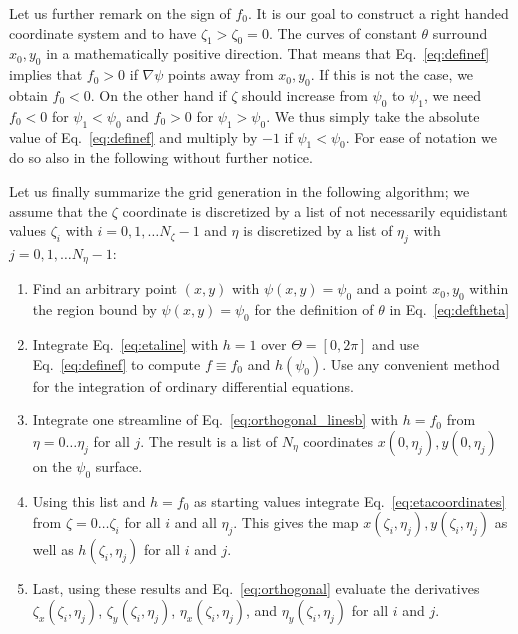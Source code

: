 Let us further remark on the sign of $f_0$. It is our goal to construct a right handed
coordinate system and to have $\zeta_1>\zeta_0=0$.
The curves of constant $\theta$ surround $x_0, y_0$ in a mathematically positive direction. 
That means that Eq.~\eqref{eq:definef} implies that $f_0>0$ if $\nabla \psi$ points away from $x_0, y_0$. If this is not the case, we obtain $f_0 < 0$. 
On the other hand if $\zeta$ should increase from $\psi_0$ to $\psi_1$, we
need $f_0 <0$ for $\psi_1<\psi_0$ and $f_0>0$ for $\psi_1>\psi_0$. 
We thus simply take the absolute value of Eq.~\eqref{eq:definef} and multiply 
by $-1$ if $\psi_1<\psi_0$. 
For ease of notation we do so also in the following without further notice.

Let us finally summarize the grid generation in the following algorithm; we 
assume that the $\zeta$ coordinate is discretized by a list of 
not necessarily equidistant values $\zeta_i$ with $i = 0,1,\dots N_\zeta-1$ 
and $\eta$ is discretized by a list of $\eta_j$ with $j = 0,1,\dots N_\eta-1$:
\begin{enumerate}
  \item Find an arbitrary point $(x,y)$ with $\psi(x,y) = \psi_0$
    and a point $x_0, y_0$ within the region bound by $\psi(x,y) = \psi_0$ for the definition of $\theta$ in Eq.~\eqref{eq:deftheta}
  \item Integrate Eq.~\eqref{eq:etaline} with $h=1$ over $\Theta=[0,2\pi]$ and use Eq.~\eqref{eq:definef} to compute $f \equiv f_0$ and $h(\psi_0)$.
    Use any convenient method for the integration of ordinary differential equations.
  \item Integrate one streamline of Eq.~\eqref{eq:orthogonal_linesb} with $h=f_0$
    from $\eta = 0\dots\eta_j$ for all $j$.
    The result is a list of $N_\eta$ coordinates $x(0,\eta_j), y(0,\eta_j)$ on the $\psi_0$ surface.
  \item Using this list and $h=f_0$ as starting values integrate Eq.~\eqref{eq:etacoordinates}
    from $\zeta=0\dots\zeta_i$ for all $i$ and all $\eta_j$. This gives the map $x(\zeta_i, \eta_j), y(\zeta_i, \eta_j)$ as well as $h(\zeta_i,\eta_j)$ for all $i$ and $j$.
  \item Last, using these results and 
    Eq.~\eqref{eq:orthogonal} evaluate the derivatives 
    $\zeta_x(\zeta_i,\eta_j)$, $\zeta_y(\zeta_i, \eta_j)$, $\eta_x(\zeta_i,\eta_j)$, and $\eta_y(\zeta_i, \eta_j)$ for all $i$ and $j$.
\end{enumerate}


